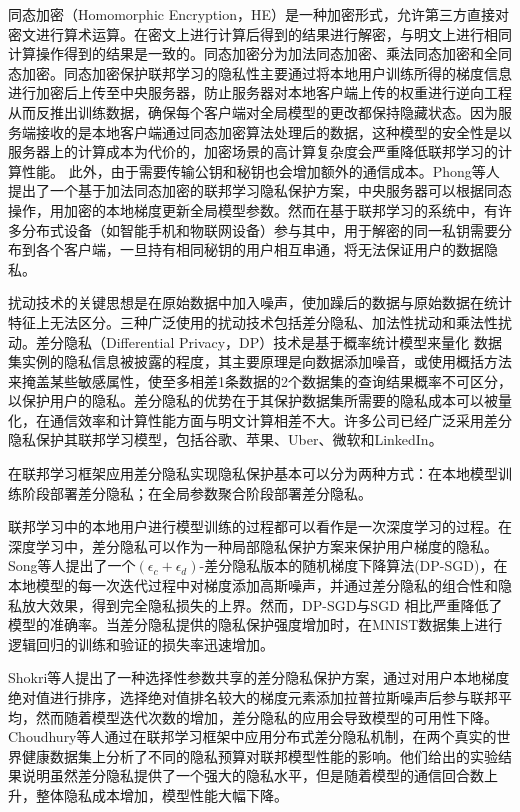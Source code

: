 同态加密（Homomorphic Encryption，HE）是一种加密形式，允许第三方直接对密文进行算术运算。在密文上进行计算后得到的结果进行解密，与明文上进行相同计算操作得到的结果是一致的。同态加密分为加法同态加密、乘法同态加密和全同态加密。同态加密保护联邦学习的隐私性主要通过将本地用户训练所得的梯度信息进行加密后上传至中央服务器，防止服务器对本地客户端上传的权重进行逆向工程从而反推出训练数据，确保每个客户端对全局模型的更改都保持隐藏状态。因为服务端接收的是本地客户端通过同态加密算法处理后的数据，这种模型的安全性是以服务器上的计算成本为代价的，加密场景的高计算复杂度会严重降低联邦学习的计算性能。 此外，由于需要传输公钥和秘钥也会增加额外的通信成本。Phong等人提出了一个基于加法同态加密的联邦学习隐私保护方案，中央服务器可以根据同态操作，用加密的本地梯度更新全局模型参数。然而在基于联邦学习的系统中，有许多分布式设备（如智能手机和物联网设备）参与其中，用于解密的同一私钥需要分布到各个客户端，一旦持有相同秘钥的用户相互串通，将无法保证用户的数据隐私。

扰动技术的关键思想是在原始数据中加入噪声，使加躁后的数据与原始数据在统计特征上无法区分。三种广泛使用的扰动技术包括差分隐私、加法性扰动和乘法性扰动。差分隐私（Differential Privacy，DP）技术是基于概率统计模型来量化
数据集实例的隐私信息被披露的程度，其主要原理是向数据添加噪音，或使用概括方法来掩盖某些敏感属性，使至多相差1条数据的2个数据集的查询结果概率不可区分，以保护用户的隐私。差分隐私的优势在于其保护数据集所需要的隐私成本可以被量化，在通信效率和计算性能方面与明文计算相差不大。许多公司已经广泛采用差分隐私保护其联邦学习模型，包括谷歌、苹果、Uber、微软和LinkedIn。

在联邦学习框架应用差分隐私实现隐私保护基本可以分为两种方式：在本地模型训练阶段部署差分隐私；在全局参数聚合阶段部署差分隐私。

联邦学习中的本地用户进行模型训练的过程都可以看作是一次深度学习的过程。在深度学习中，差分隐私可以作为一种局部隐私保护方案来保护用户梯度的隐私。Song等人提出了一个$\left(\epsilon_{c}+\epsilon_{d}\right)$-差分隐私版本的随机梯度下降算法(DP-SGD)，在本地模型的每一次迭代过程中对梯度添加高斯噪声，并通过差分隐私的组合性和隐私放大效果，得到完全隐私损失的上界。然而，DP-SGD与SGD 相比严重降低了模型的准确率。当差分隐私提供的隐私保护强度增加时，在MNIST数据集上进行逻辑回归的训练和验证的损失率迅速增加。

Shokri等人提出了一种选择性参数共享的差分隐私保护方案，通过对用户本地梯度绝对值进行排序，选择绝对值排名较大的梯度元素添加拉普拉斯噪声后参与联邦平均，然而随着模型迭代次数的增加，差分隐私的应用会导致模型的可用性下降。Choudhury等人通过在联邦学习框架中应用分布式差分隐私机制，在两个真实的世界健康数据集上分析了不同的隐私预算对联邦模型性能的影响。他们给出的实验结果说明虽然差分隐私提供了一个强大的隐私水平，但是随着模型的通信回合数上升，整体隐私成本增加，模型性能大幅下降。

